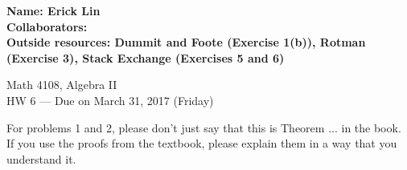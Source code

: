 \documentclass[12pt]{article}
\begin{document}
\noindent
\textbf{Name: Erick Lin} \smallskip  \\
\textbf{Collaborators:} \smallskip \\ %
\textbf{Outside resources: Dummit and Foote (Exercise 1(b)), Rotman (Exercise 3), Stack Exchange (Exercises 5 and 6)} \smallskip \\ %

\begin{center}
{
Math 4108, Algebra II \\
HW 6 --- Due on March 31, 2017 (Friday)
}
\end{center}

For problems 1 and 2, please don't just say that this is Theorem ... in the book.  If you use the proofs from the textbook, please explain them in a way that you understand it.
\end{document}
